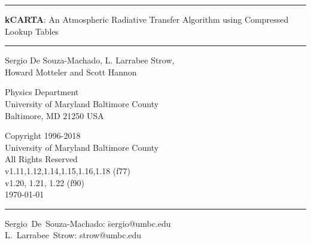 \documentclass[12pt]{article}
\newcommand{\HRule}{\rule{\linewidth}{1mm}}
\newcommand{\HRulethin}{\rule{\linewidth}{0.5mm}}
\begin{document}
\thispagestyle{empty}
\vspace{2.0in}

\noindent\HRule
\begin{center}
\Huge \textbf{\textsf{kCARTA}}: An Atmospheric Radiative Transfer Algorithm 
using Compressed Lookup Tables
\end{center}
\noindent\HRule

\vspace{0.75in}
\begin{center}
\begin{Large}
Sergio De Souza-Machado, L. Larrabee Strow,\\ Howard Motteler and Scott
Hannon
\end{Large}
\end{center}

\vspace{0.5in}
\begin{center}
Physics Department\\
University of Maryland Baltimore County\\Baltimore, MD 21250 USA\\
\end{center}

\vspace{0.5in}
\begin{center}
Copyright 1996-2018 \\
University of Maryland Baltimore County \\
All Rights Reserved\\
v1.11,1.12,1.14,1.15,1.16,1.18 (f77)\\
v1.20, 1.21, 1.22 (f90)\\
\today\\
\end{center}

\vfill

\noindent\HRulethin
\begin{flushleft}
\begin{tabbing}
Sergio~De~Souza-Machado: \=    sergio@umbc.edu \\
L.~Larrabee~Strow:   \>        strow@umbc.edu\\
\end{tabbing}
\end{flushleft}


\newpage
\tableofcontents
\listoftables
\listoffigures
\newpage
\end{document}
